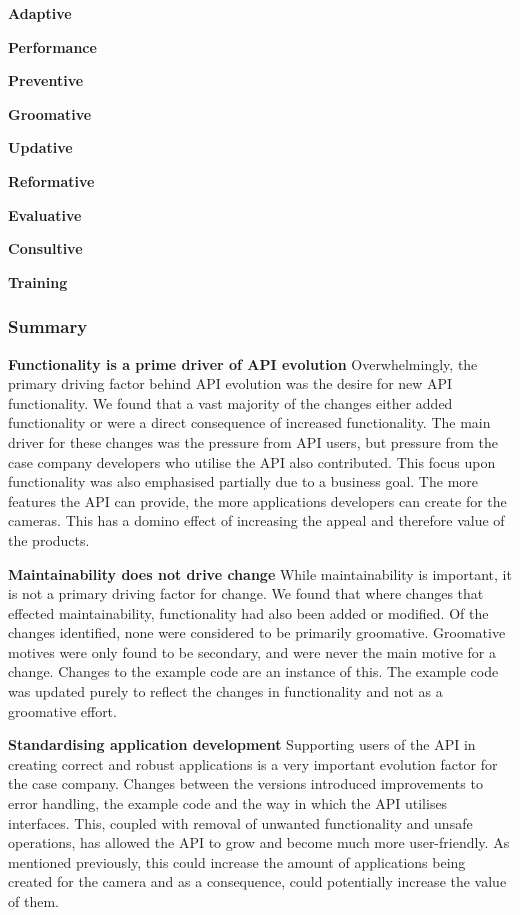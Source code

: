 \documentclass{sig-alternate}
\begin{document}
\smallskip \noindent
\textbf{Adaptive  }

\smallskip \noindent
\textbf{Performance  }

\smallskip \noindent
\textbf{Preventive  }

\smallskip \noindent
\textbf{Groomative  }

\smallskip \noindent
\textbf{Updative  }

\smallskip \noindent
\textbf{Reformative  }

\smallskip \noindent
\textbf{Evaluative  }

\smallskip \noindent
\textbf{Consultive  }

\smallskip \noindent
\textbf{Training  }

\subsubsection{Summary}


\noindent
\textbf{Functionality is a prime driver of API evolution  }  %
Overwhelmingly, the primary driving factor behind API evolution was the desire for new API functionality. We found that a vast majority of the changes either added functionality or were a direct consequence of increased functionality. The main driver for these changes was the pressure from API users, but pressure from the case company developers who utilise the API also contributed. This focus upon functionality was also emphasised partially due to a business goal. The more features the API can provide, the more applications developers can create for the cameras. This has a domino effect of increasing the appeal and therefore value of the products.

\smallskip \noindent 
\textbf{Maintainability does not drive change  }  %
While maintainability is important, it is not a primary driving factor for change. We found that where changes that effected maintainability, functionality had also been added or modified. Of the changes identified, none were considered to be primarily groomative. Groomative motives were only found to be secondary, and were never the main motive for a change. Changes to the example code are an instance of this. The example code was updated purely to reflect the changes in functionality and not as a groomative effort. 

\smallskip \noindent
\textbf{Standardising application development  } %
Supporting users of the API in creating correct and robust applications is a very important evolution factor for the case company. Changes between the versions introduced improvements to error handling, the example code and the way in which the API utilises interfaces. This, coupled with removal of unwanted functionality and unsafe operations, has allowed the API to grow and become much more user-friendly. As mentioned previously, this could increase the amount of applications being created for the camera and as a consequence, could potentially increase the value of them.
\end{document}
